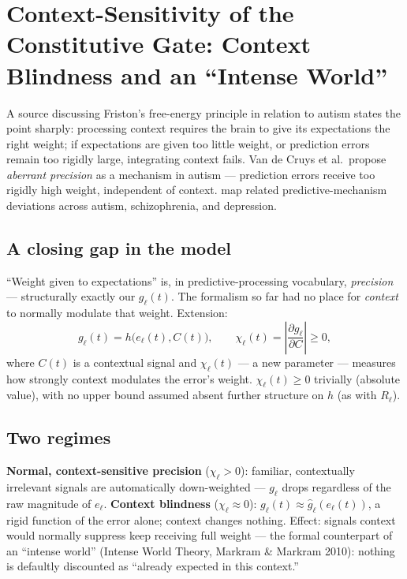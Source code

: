 \documentclass[11pt]{article}
\begin{document}
\section{Context-Sensitivity of the Constitutive Gate: Context Blindness and an ``Intense World''}

A source discussing Friston's free-energy principle in relation to autism \cite{vandecruys2014} states the point sharply: processing context requires the brain to give its expectations the right weight; if expectations are given too little weight, or prediction errors remain too rigidly large, integrating context fails. Van de Cruys et al.\ propose \emph{aberrant precision} as a mechanism in autism --- prediction errors receive too rigidly high weight, independent of context. \cite{qela2025} map related predictive-mechanism deviations across autism, schizophrenia, and depression.

\subsection*{A closing gap in the model}
``Weight given to expectations'' is, in predictive-processing vocabulary, \emph{precision} --- structurally exactly our $g_\ell(t)$. The formalism so far had no place for \emph{context} to normally modulate that weight. Extension:
\[
g_\ell(t) = h\big(e_\ell(t), C(t)\big), \qquad \chi_\ell(t) = \left|\frac{\partial g_\ell}{\partial C}\right| \ge 0,
\]
where $C(t)$ is a contextual signal and $\chi_\ell(t)$ --- a new parameter --- measures how strongly context modulates the error's weight. $\chi_\ell(t)\ge0$ trivially (absolute value), with no upper bound assumed absent further structure on $h$ (as with $R_\ell$).

\subsection*{Two regimes}
\textbf{Normal, context-sensitive precision} ($\chi_\ell>0$): familiar, contextually irrelevant signals are automatically down-weighted --- $g_\ell$ drops regardless of the raw magnitude of $e_\ell$. \textbf{Context blindness} ($\chi_\ell\approx0$): $g_\ell(t)\approx\hat g_\ell(e_\ell(t))$, a rigid function of the error alone; context changes nothing. Effect: signals context would normally suppress keep receiving full weight --- the formal counterpart of an ``intense world'' (Intense World Theory, Markram \& Markram 2010): nothing is defaultly discounted as ``already expected in this context.''
\end{document}
